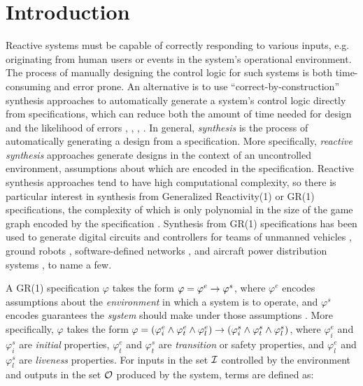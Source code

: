 \documentclass[runningheads]{llncs}
\begin{document}
\section{Introduction}

Reactive systems must be capable of correctly responding to various inputs, 
e.g. originating from human users or events in the system's operational environment. 
The process of manually designing the control logic for such systems is both time-consuming and error prone. 
An alternative is to use ``correct-by-construction'' synthesis approaches to automatically generate 
a system's control logic directly from specifications, which can 
reduce both the amount of time needed for design and the likelihood of errors 
\cite{alur2016compositional}, \cite{fainekos2009temporal}, \cite{guo2014cooperative}, \cite{kupermann2001synthesizing}. 
In general, \emph{synthesis} is the process of automatically generating a design from a specification. 
More specifically, \emph{reactive synthesis} approaches generate designs in the context of an uncontrolled environment, 
assumptions about which are encoded in the specification.
Reactive synthesis approaches tend to have high computational complexity,  
so there is particular interest in synthesis from Generalized Reactivity(1) or GR(1) specifications, 
the complexity of which is only polynomial in the size of the game graph encoded by the specification \cite{bloem2012}.
Synthesis from GR(1) specifications has been used to generate digital circuits \cite{ehlers2012symbolically} 
and controllers for teams of unmanned vehicles \cite{apker2016}, ground robots \cite{kress2007s}, 
software-defined networks \cite{wang2013automated}, and aircraft power distribution systems \cite{xu2012case}, to name a few.

A GR(1) specification $\varphi$ takes the form $\varphi = \varphi^e \rightarrow \varphi^s$, 
where $\varphi^e$ encodes assumptions about the \emph{environment} in which a system is to operate,
and $\varphi^s$ encodes guarantees the \emph{system} should make under those assumptions \cite{Ehlers2016}. 
More specifically, $\varphi$ takes the form 
$\varphi = (\varphi^e_i \land \varphi^e_t \land \varphi^e_l)  \rightarrow (\varphi^s_i \land \varphi^s_t \land \varphi^s_l)$,
where $\varphi^e_i$ and $\varphi^s_i$ are \emph{initial} properties, 
$\varphi^e_t$ and $\varphi^s_t$ are \emph{transition} or safety properties, and 
$\varphi^e_l$ and $\varphi^s_l$ are \emph{liveness} properties. 
For inputs in the set $\mathcal{I}$ controlled by the environment 
and outputs in the set $\mathcal{O}$ produced by the system, terms are defined as:
\end{document}
